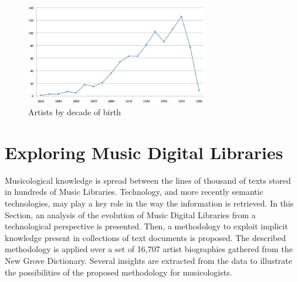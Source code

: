 \begin{figure}[!ht]
	\centering
	\includegraphics[width=8cm]{ch05_musicology_pics/Artists-by-decade-of-birth.jpg}
	\caption{Artists by decade of birth 
	\label{fig:musicology:graph-decade}}
\end{figure}


\section{Exploring Music Digital Libraries}

Musicological knowledge is spread between the lines of thousand of texts stored in hundreds of Music Libraries. Technology, and more recently semantic technologies, may play a key role in the way the information is retrieved. In this Section, an analysis of the evolution of Music Digital Libraries from a technological perspective is presented. Then, a methodology to exploit implicit knowledge present in collections of text documents is proposed. The described methodology is applied over a set of 16,707 artist biographies gathered from the New Grove Dictionary. %
Several insights are extracted from the data to illustrate the possibilities of the proposed methodology for musicologists.


